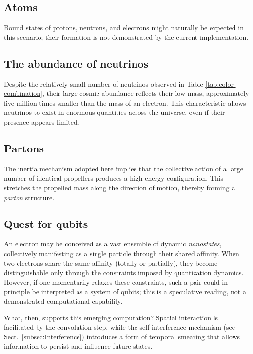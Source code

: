 \documentclass{ijuc}
\begin{document}
\subsection{Atoms}
Bound states of protons, neutrons, and electrons might naturally be expected in this scenario; their formation is not demonstrated by the current implementation.

\subsection{The abundance of neutrinos}

Despite the relatively small number of neutrinos observed in Table \ref{tab:color-combination}, their large cosmic abundance reflects their low mass, approximately five million times smaller than the mass of an electron. 
This characteristic allows neutrinos to exist in enormous quantities across the universe, even if their presence appears limited.

\subsection{Partons}
The inertia mechanism adopted here implies that the collective action of a large number of identical propellers produces a high‑energy configuration. This stretches the propelled mass along the direction of motion, thereby forming a \textit{parton} structure.

\subsection{Quest for qubits} \label{subsection:qubits}

An electron may be conceived as a vast ensemble of dynamic \textit{nanostates}, collectively manifesting as a single particle through their shared affinity. 
When two electrons share the same affinity (totally or partially), they become distinguishable only through the constraints imposed by quantization dynamics. 
However, if one momentarily relaxes these constraints, such a pair could in principle be interpreted as a system of qubits; this is a speculative reading, not a demonstrated computational capability.

What, then, supports this emerging computation? 
Spatial interaction is facilitated by the convolution step, while the self-interference mechanism (see Sect.~\ref{subsec:Interference}) introduces a form of temporal smearing that allows information to persist and influence future states.
\end{document}
